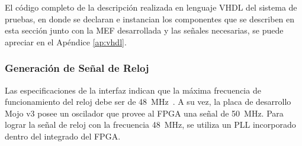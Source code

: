 %		
%
%
%
El código completo de la descripción realizada en lenguaje VHDL del sistema de pruebas, en donde se declaran e instancian los componentes que se describen en esta sección junto con la MEF desarrollada y las señales necesarias, se puede apreciar en el Apéndice \ref{ap:vhdl}.

	\subsubsection{Generación de Señal de Reloj}
		Las especificaciones de la interfaz indican que la máxima frecuencia de funcionamiento del reloj debe ser de \SI{48}{\mega\hertz}~\cite{Cypress2017}. A su vez, la placa de desarrollo Mojo v3 posee un oscilador que provee al FPGA una señal de \SI{50}{\mega\hertz}. Para lograr la señal de reloj con la frecuencia \SI{48}{\mega\hertz}, se utiliza un PLL incorporado dentro del integrado del FPGA. 
		
